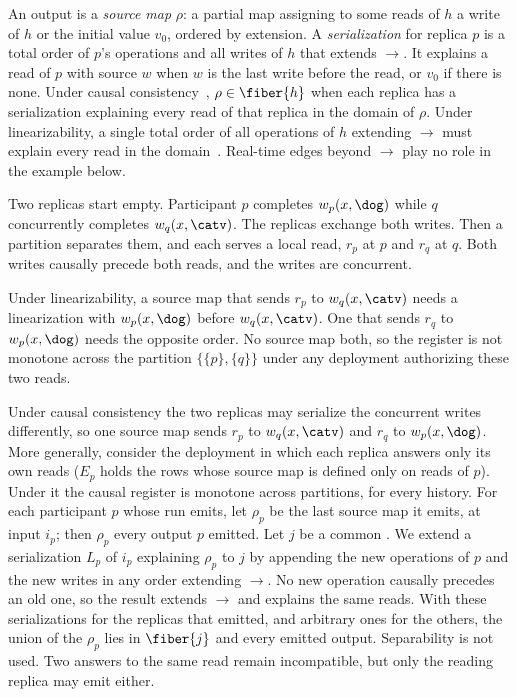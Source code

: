 An output is a \emph{source map} $\rho$: a partial map assigning to some reads
of $h$ a write of $h$ or the initial value $v_0$, ordered by extension.  A
\emph{serialization} for replica $p$ is a total order of $p$'s operations and
all writes of $h$ that extends $\to$.  It explains a read of $p$ with source
$w$ when $w$ is the last write before the read, or $v_0$ if there is none.
Under causal consistency~\cite{lamport1978time,ahamad1995causal},
$\rho\in\fiber{h}$ when each replica has a serialization explaining every read
of that replica in the domain of $\rho$.  Under linearizability, a single
total order of all operations of $h$ extending $\to$ must explain every read
in the domain~\cite{herlihy1990linearizability}.  Real-time edges beyond $\to$
play no role in the example below.

Two replicas start empty.  Participant $p$ completes $w_p(x,\dog)$ while $q$
concurrently completes $w_q(x,\catv)$.  The replicas exchange both writes.
Then a partition separates them, and each serves a local read, $r_p$ at $p$
and $r_q$ at $q$.  Both writes causally precede both reads, and the writes are
concurrent.

Under linearizability, a source map that sends $r_p$ to $w_q(x,\catv)$ needs a
linearization with $w_p(x,\dog)$ before $w_q(x,\catv)$.  One that sends $r_q$
to $w_p(x,\dog)$ needs the opposite order.  No source map \outrel both, so the
register is not monotone across the partition $\{\{p\},\{q\}\}$ under any
deployment authorizing these two reads.

Under causal consistency the two replicas may serialize the concurrent writes
differently, so one source map sends $r_p$ to $w_q(x,\catv)$ and $r_q$ to
$w_p(x,\dog)$.  More generally, consider the deployment in which each replica
answers only its own reads ($E_p$ holds the rows whose source map is defined
only on reads of $p$).  Under it the causal register is monotone across
partitions, for every history.  For each participant $p$ whose run emits, let
$\rho_p$ be the last source map it emits, at input $i_p$; then $\rho_p$
\outrel every output $p$ emitted.  Let $j$ be a common \indesc.  We extend a
serialization $L_p$ of $i_p$ explaining $\rho_p$ to $j$ by appending the new
operations of $p$ and the new writes in any order extending $\to$.  No new
operation causally precedes an old one, so the result extends $\to$ and
explains the same reads.  With these serializations for the replicas that
emitted, and arbitrary ones for the others, the union of the $\rho_p$ lies in
$\fiber{j}$ and \outrel every emitted output.
Separability is not used.  Two answers to the same read remain incompatible,
but only the reading replica may emit either.

